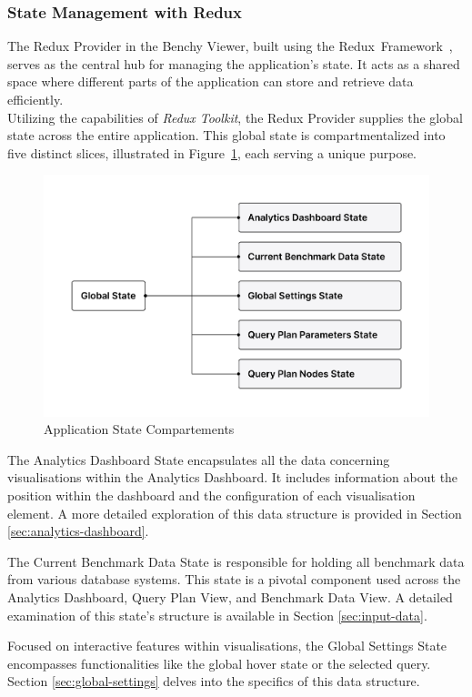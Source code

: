 \subsubsection{State Management with Redux}
The Redux Provider in the Benchy Viewer, built using the Redux~Framework~\parencite{Redux}, serves as the central hub for managing the application's state. It acts as a shared space where different parts of the application can store and retrieve data efficiently.\\
Utilizing the capabilities of \textit{Redux Toolkit}\parencite{redux-toolkit}, the Redux Provider supplies the global state across the entire application. This global state is compartmentalized into five distinct slices, illustrated in Figure~\ref{fig:global-state}, each serving a unique purpose.

\begin{figure}[h]
  \centering
  \includegraphics[width=0.8\linewidth]{figures/global-state.png}
  \caption{Application State Compartements}
  \label{fig:global-state}
\end{figure}

The Analytics Dashboard State encapsulates all the data concerning visualisations within the Analytics Dashboard. It includes information about the position within the dashboard and the configuration of each visualisation element. A more detailed exploration of this data structure is provided in Section \ref{sec:analytics-dashboard}.

The Current Benchmark Data State is responsible for holding all benchmark data from various database systems. This state is a pivotal component used across the Analytics Dashboard, Query Plan View, and Benchmark Data View. A detailed examination of this state's structure is available in Section \ref{sec:input-data}.

Focused on interactive features within visualisations, the Global Settings State encompasses functionalities like the global hover state or the selected query. Section \ref{sec:global-settings} delves into the specifics of this data structure.

